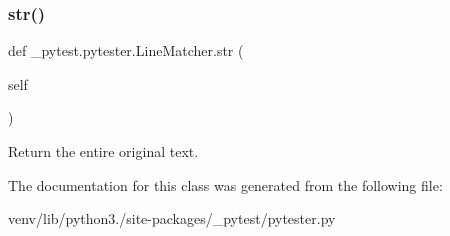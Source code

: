 \subsubsection{\texorpdfstring{str()}{str()}}
{\footnotesize\ttfamily def \+\_\+pytest.\+pytester.\+Line\+Matcher.\+str (\begin{DoxyParamCaption}\item[{}]{self }\end{DoxyParamCaption})}

\begin{DoxyVerb}Return the entire original text.\end{DoxyVerb}
 

The documentation for this class was generated from the following file\+:\begin{DoxyCompactItemize}
\item 
venv/lib/python3./site-\/packages/\+\_\+pytest/pytester.\+py\end{DoxyCompactItemize}
